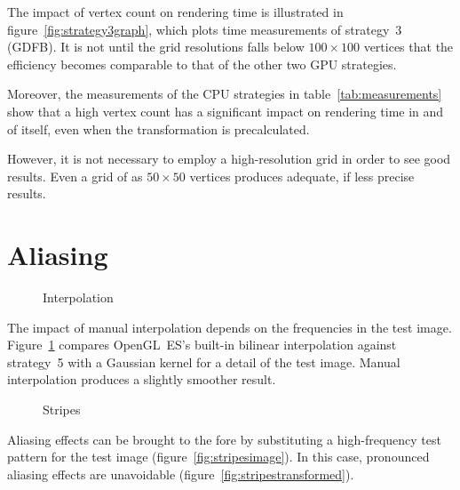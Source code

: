 \documentclass[english,12pt]{ifimaster}
\begin{document}
The impact of vertex count on rendering time is illustrated in
figure~\ref{fig:strategy3graph}, which plots time measurements of
strategy~3 (GDFB). It is not until the grid resolutions falls below
$100 \times 100$ vertices that the efficiency becomes comparable to
that of the other two GPU strategies.

Moreover, the measurements of the CPU strategies in
table~\ref{tab:measurements} show that a high vertex count has a
significant impact on rendering time in and of itself, even when the
transformation is precalculated.

However, it is not necessary to employ a high-resolution grid in order
to see good results. Even a grid of as $50 \times 50$ vertices
produces adequate, if less precise results.

\section{Aliasing}

\begin{figure}
  \centering
  \quad{}

  \caption{Interpolation}
  \label{fig:interpolation}
\end{figure}

The impact of manual interpolation depends on the frequencies in the
test image. Figure~\ref{fig:interpolation} compares OpenGL~ES's built-in
bilinear interpolation against strategy~5 with a Gaussian kernel for a
detail of the test image. Manual interpolation produces a slightly
smoother result.

\begin{figure}[b]
  \centering
  \quad{}

  \caption{Stripes}
  \label{fig:Stripes}
\end{figure}

Aliasing effects can be brought to the fore by substituting a
high-frequency test pattern for the test image
(figure~\ref{fig:stripesimage}). In this case, pronounced aliasing
effects are unavoidable (figure~\ref{fig:stripestransformed}).
\end{document}
